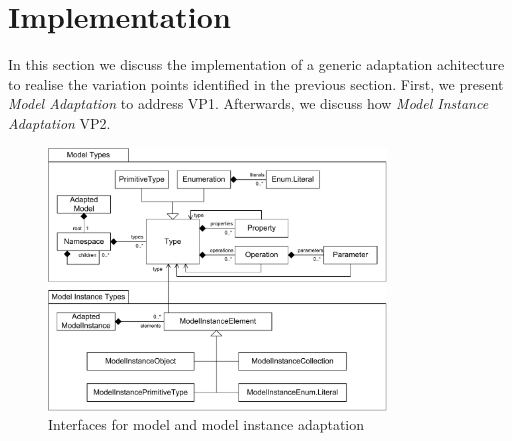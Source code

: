 \section{Implementation}
\label{sec:implementation}
	In this section we discuss the implementation of a generic adaptation
	achitecture to realise the
	variation points identified in the previous section. First, we present
	\emph{Model Adaptation} to address  VP1. Afterwards, we discuss how \emph{Model
	Instance Adaptation}  VP2.
	
	\begin{figure}[p]
			\centering
				\includegraphics[width=0.80\textwidth]{figures/coreconcepts.pdf}
			\caption{
			Interfaces for model and model instance adaptation
			}
			\label{fig:coreconcepts}
			
			\vspace{4.0em}
			

\end{figure}
